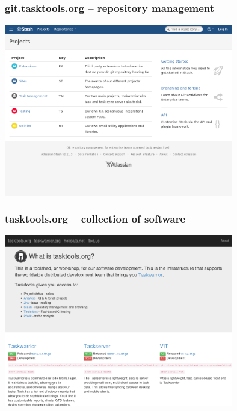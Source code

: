 \documentclass[t,handout]{beamer}
\begin{document}
\begin{frame}\frametitle{git.tasktools.org -- repository management}
    \begin{center}
        \href{https://git.tasktools.org/}{\includegraphics[width=10cm,height=7.5cm]{git-tasktools-org.png}}
    \end{center}
\end{frame}

\begin{frame}\frametitle{tasktools.org -- collection of software}
    \begin{center}
        \href{http://tasktools.org/}{\includegraphics[width=10cm,height=7.5cm]{tasktools-org.png}}
    \end{center}
\end{frame}
\end{document}
